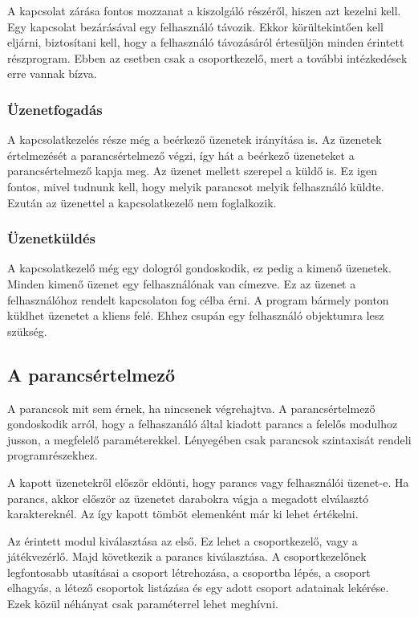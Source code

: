 \documentclass[bibliography=totocnumbered]{article}
\begin{document}
A kapcsolat zárása fontos mozzanat a kiszolgáló részéről, hiszen azt
kezelni kell. Egy kapcsolat bezárásával egy felhasználó távozik. Ekkor
körültekintően kell eljárni, biztosítani kell, hogy a felhasználó
távozásáról értesüljön minden érintett részprogram. Ebben az esetben
csak a csoportkezelő, mert a további intézkedések erre vannak bízva.


\subsubsection{Üzenetfogadás}

A kapcsolatkezelés része még a beérkező üzenetek irányítása is. Az
üzenetek értelmezését a parancsértelmező végzi, így hát a beérkező
üzeneteket a parancsértelmező kapja meg. Az üzenet mellett szerepel a
küldő is. Ez igen fontos, mivel tudnunk kell, hogy melyik parancsot
melyik felhasználó küldte. Ezután az üzenettel a kapcsolatkezelő nem
foglalkozik.


\subsubsection{Üzenetküldés}

A kapcsolatkezelő még egy dologról gondoskodik, ez pedig a kimenő
üzenetek. Minden kimenő üzenet egy felhasználónak van címezve. Ez az
üzenet a felhasználóhoz rendelt kapcsolaton fog célba érni. A program
bármely ponton küldhet üzenetet a kliens felé. Ehhez csupán egy
felhasználó objektumra lesz szükség.


\subsection{A parancsértelmező}

A parancsok mit sem érnek, ha nincsenek végrehajtva. A parancsértelmező
gondoskodik arról, hogy a felhaszanáló által kiadott parancs a felelős
modulhoz jusson, a megfelelő paraméterekkel. Lényegében csak parancsok
szintaxisát rendeli programrészekhez.

A kapott üzenetekről először eldönti, hogy parancs vagy felhasználói
üzenet-e. Ha parancs, akkor először az üzenetet darabokra vágja a
megadott elválasztó karaktereknél. Az így kapott tömböt elemenként már
ki lehet értékelni.

Az érintett modul kiválasztása az első. Ez lehet a csoportkezelő, vagy a
játékvezérlő. Majd következik a parancs kiválasztása. A csoportkezelőnek
legfontosabb utasításai a csoport létrehozása, a csoportba lépés, a
csoport elhagyás, a létező csoportok listázása és egy adott csoport
adatainak lekérése. Ezek közül néhányat csak paraméterrel lehet
meghívni.
\end{document}
